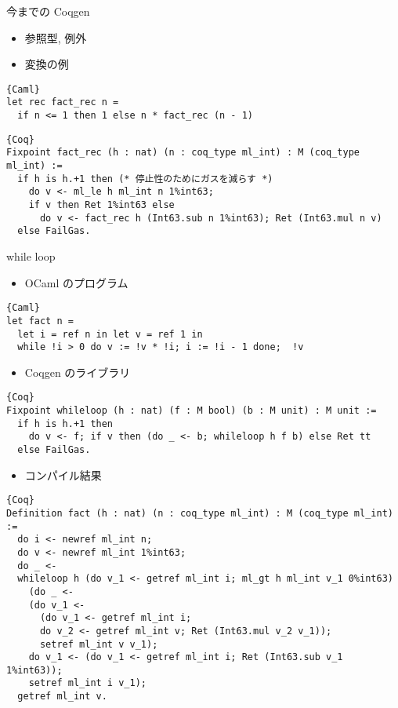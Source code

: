 \documentclass[unicode,mathserif]{beamer}
\begin{document}
\begin{frame}[fragile]
\begin{columns}[T]
\begin{column}{0.33\columnwidth}
\begin{block}{今までの Coqgen}
\begin{itemize}
          \item 参照型, 例外
          \item 変換の例
        \end{itemize}
        \begin{lstlisting}{Caml}
let rec fact_rec n =
  if n <= 1 then 1 else n * fact_rec (n - 1)  \end{lstlisting}
        \begin{lstlisting}{Coq}
Fixpoint fact_rec (h : nat) (n : coq_type ml_int) : M (coq_type ml_int) :=
  if h is h.+1 then (* 停止性のためにガスを減らす *)
    do v <- ml_le h ml_int n 1%int63;
    if v then Ret 1%int63 else
      do v <- fact_rec h (Int63.sub n 1%int63); Ret (Int63.mul n v)
  else FailGas.  \end{lstlisting}
      \end{block}
      \begin{block}{while loop}
        \begin{itemize}
          \item OCaml のプログラム
        \end{itemize}
        \begin{lstlisting}{Caml}
let fact n =
  let i = ref n in let v = ref 1 in
  while !i > 0 do v := !v * !i; i := !i - 1 done;  !v  \end{lstlisting}
        \begin{itemize}
          \item Coqgen のライブラリ
        \end{itemize}
          \begin{lstlisting}{Coq}
Fixpoint whileloop (h : nat) (f : M bool) (b : M unit) : M unit :=
  if h is h.+1 then
    do v <- f; if v then (do _ <- b; whileloop h f b) else Ret tt
  else FailGas.  \end{lstlisting}
        \begin{itemize}
          \item コンパイル結果
        \end{itemize}
        \begin{lstlisting}{Coq}
Definition fact (h : nat) (n : coq_type ml_int) : M (coq_type ml_int) :=
  do i <- newref ml_int n;
  do v <- newref ml_int 1%int63;
  do _ <-
  whileloop h (do v_1 <- getref ml_int i; ml_gt h ml_int v_1 0%int63)
    (do _ <-
    (do v_1 <-
      (do v_1 <- getref ml_int i;
      do v_2 <- getref ml_int v; Ret (Int63.mul v_2 v_1));
      setref ml_int v v_1);
    do v_1 <- (do v_1 <- getref ml_int i; Ret (Int63.sub v_1 1%int63));
    setref ml_int i v_1);
  getref ml_int v.  \end{lstlisting}
      \end{block}
    \end{column}


\end{columns}
\end{frame}
\end{document}

